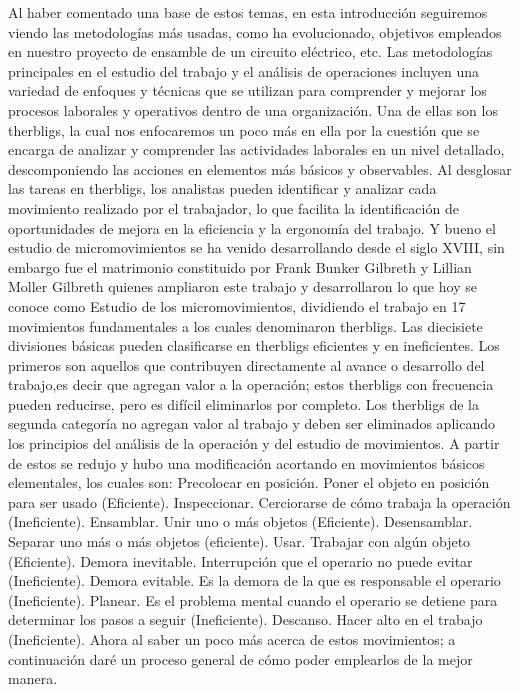 \begin{itemize}
Al haber comentado una base de estos temas, en esta introducción seguiremos viendo las metodologías más usadas, como ha evolucionado, objetivos empleados en nuestro proyecto de ensamble de un circuito eléctrico, etc.
Las metodologías principales en el estudio del trabajo y el análisis de operaciones incluyen una variedad de enfoques y técnicas que se utilizan para comprender y mejorar los procesos laborales y operativos dentro de una organización.
Una de ellas son los therbligs, la cual nos enfocaremos un poco más en ella por la cuestión que se encarga de analizar y comprender las actividades laborales en un nivel detallado, descomponiendo las acciones en elementos más básicos y observables. Al desglosar las tareas en therbligs, los analistas pueden identificar y analizar cada movimiento realizado por el trabajador, lo que facilita la identificación de oportunidades de mejora en la eficiencia y la ergonomía del trabajo.
Y bueno el  estudio de micromovimientos se ha venido desarrollando desde el siglo XVIII, sin embargo fue el matrimonio constituido por Frank Bunker Gilbreth y Lillian Moller Gilbreth quienes ampliaron este trabajo y desarrollaron lo que hoy se conoce como Estudio de los micromovimientos, dividiendo el trabajo en 17 movimientos fundamentales a los cuales denominaron therbligs.
Las diecisiete divisiones básicas pueden clasificarse en therbligs eficientes y en ineficientes. Los primeros son aquellos que contribuyen directamente al avance o desarrollo del trabajo,es decir que agregan valor a la operación; estos therbligs con frecuencia pueden reducirse, pero es difícil eliminarlos por completo.
Los therbligs de la segunda categoría no agregan valor al trabajo y deben ser eliminados aplicando los principios del análisis de la operación y del estudio de movimientos.
A partir de estos se redujo y hubo una modificación acortando en movimientos básicos elementales, los cuales son:
Precolocar en posición. Poner el objeto en posición para ser usado (Eficiente).
Inspeccionar. Cerciorarse de cómo trabaja la operación (Ineficiente).
Ensamblar. Unir uno o más objetos (Eficiente).
Desensamblar. Separar uno más o más objetos (eficiente).
Usar. Trabajar con algún objeto (Eficiente).
Demora inevitable. Interrupción que el operario no puede evitar (Ineficiente).
Demora evitable. Es la demora de la que es responsable el operario (Ineficiente).
Planear. Es el problema mental cuando el operario se detiene para determinar los pasos a seguir (Ineficiente).
Descanso. Hacer alto en el trabajo (Ineficiente).
Ahora al saber un poco más acerca de estos movimientos; a continuación daré un proceso general de cómo poder emplearlos de la mejor manera.

\end{itemize}
